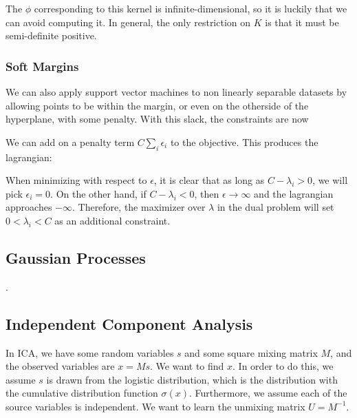 \documentclass[12pt]{article}
\begin{document}

The $\phi$ corresponding to this kernel is infinite-dimensional, so it is luckily that we can avoid computing it. In general, the only restriction on $K$ is that it must be semi-definite positive.

\subsubsection{Soft Margins}

We can also apply support vector machines to non linearly separable datasets by allowing points to be within the margin, or even on the otherside of the hyperplane, with some penalty. With this slack, the constraints are now


We can add on a penalty term $C\sum_i \epsilon_i$ to the objective. This produces the lagrangian:


When minimizing with respect to $\epsilon$, it is clear that as long as $C-\lambda_i > 0$, we will pick $\epsilon_i = 0$. On the other hand, if $C -\lambda_i < 0$, then $\epsilon \rightarrow \infty$ and the lagrangian approaches $- \infty$. Therefore, the maximizer over $\lambda$ in the dual problem will set $0 < \lambda_i < C$ as an additional constraint.

\subsection{Gaussian Processes}
.
\subsection{Independent Component Analysis}

In ICA, we have some random variables $s$ and some square mixing matrix $M$, and the observed variables are $x = Ms$. We want to find $x$. In order to do this, we assume $s$ is drawn from the logistic distribution, which is the distribution with the cumulative distribution function $\sigma(x)$. Furthermore, we assume each of the source variables is independent. We want to learn the unmixing matrix $U = M^{-1}$. 
\end{document}
